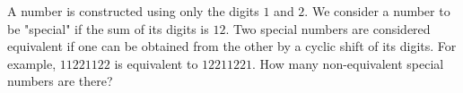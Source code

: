 A number is constructed using only the digits $1$ and $2$. We consider a number to be "special" if the sum of its digits is $12$. Two special numbers are considered equivalent if one can be obtained from the other by a cyclic shift of its digits. For example, $11221122$ is equivalent to $12211221$. How many non-equivalent special numbers are there?
